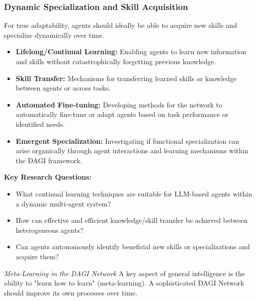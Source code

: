 \documentclass[12pt]{amsart}
\begin{document}
\subsubsection{Dynamic Specialization and Skill Acquisition}
\label{subsubsec:dynamic_specialization}
For true adaptability, agents should ideally be able to acquire new skills and specialize dynamically over time.
\begin{itemize}[leftmargin=*]
    \item \textbf{Lifelong/Continual Learning:} Enabling agents to learn new information and skills without catastrophically forgetting previous knowledge.
    \item \textbf{Skill Transfer:} Mechanisms for transferring learned skills or knowledge between agents or across tasks.
    \item \textbf{Automated Fine-tuning:} Developing methods for the network to automatically fine-tune or adapt agents based on task performance or identified needs.
    \item \textbf{Emergent Specialization:} Investigating if functional specialization can arise organically through agent interactions and learning mechanisms within the DAGI framework.
\end{itemize}
\textbf{Key Research Questions:}
\begin{itemize}[leftmargin=*, label={--}]
    \item What continual learning techniques are suitable for LLM-based agents within a dynamic multi-agent system?
    \item How can effective and efficient knowledge/skill transfer be achieved between heterogeneous agents?
    \item Can agents autonomously identify beneficial new skills or specializations and acquire them?
\end{itemize}

 \textit{Meta-Learning in the DAGI Network} 
\label{subsec:meta_learning}
A key aspect of general intelligence is the ability to "learn how to learn" (meta-learning). A sophisticated DAGI Network should improve its own processes over time.
\end{document}
